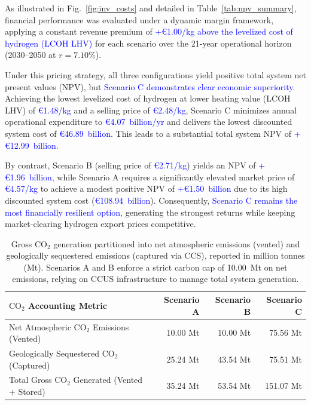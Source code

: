 \documentclass[preprint,12pt]{elsarticle}
\begin{document}
As illustrated in Fig.~\ref{fig:inv_costs} and detailed in Table~\ref{tab:npv_summary}, financial performance was evaluated under a dynamic margin framework, applying a constant revenue premium of \textcolor{blue}{+€1.00/kg above the levelized cost of hydrogen (LCOH LHV)} for each scenario over the 21-year operational horizon (2030–2050 at $r = 7.10\%$).

Under this pricing strategy, all three configurations yield positive total system net present values (NPV), but \textcolor{blue}{Scenario C demonstrates clear economic superiority}. Achieving the lowest levelized cost of hydrogen at lower heating value (LCOH LHV) of \textcolor{blue}{€1.48/kg} and a selling price of \textcolor{blue}{€2.48/kg}, Scenario C minimizes annual operational expenditure to \textcolor{blue}{€4.07~billion/yr} and delivers the lowest discounted system cost of \textcolor{blue}{€46.89~billion}. This leads to a substantial total system NPV of \textcolor{blue}{+€12.99~billion}.

By contrast, Scenario B (selling price of \textcolor{blue}{€2.71/kg}) yields an NPV of \textcolor{blue}{+€1.96~billion}, while Scenario A requires a significantly elevated market price of \textcolor{blue}{€4.57/kg} to achieve a modest positive NPV of \textcolor{blue}{+€1.50~billion} due to its high discounted system cost (\textcolor{blue}{€108.94~billion}). Consequently, \textcolor{blue}{Scenario C remains the most financially resilient option}, generating the strongest returns while keeping market-clearing hydrogen export prices competitive.


\begin{table}[htbp]
\centering
\caption{Gross $\text{CO}_2$ generation partitioned into net atmospheric emissions (vented) and geologically sequestered emissions (captured via CCS), reported in million tonnes (Mt). Scenarios A and B enforce a strict carbon cap of 10.00~Mt on net emissions, relying on CCUS infrastructure to manage total system generation.}
\label{tab:co2_mass_balance}
\begin{tabular}{lrrr}
\toprule
{$\text{CO}_2$ Accounting Metric} & {Scenario A} & {Scenario B} & {Scenario C} \\ \midrule
Net Atmospheric $\text{CO}_2$ Emissions (Vented) & 10.00 Mt & 10.00 Mt & 75.56 Mt \\
Geologically Sequestered $\text{CO}_2$ (Captured) & 25.24 Mt & 43.54 Mt & 75.51 Mt \\ \midrule
Total Gross $\text{CO}_2$ Generated (Vented + Stored) & 35.24 Mt & 53.54 Mt & 151.07 Mt \\ \bottomrule
\end{tabular}
\end{table}
\end{document}
